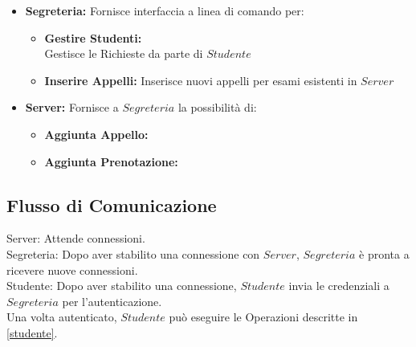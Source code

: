 \begin{itemize}
	\item \textbf{Segreteria:}\label{segreteria}  Fornisce interfaccia a linea di comando per:
	\begin{itemize}
		\item \textbf{Gestire Studenti:}\\
		Gestisce le Richieste da parte di $Studente$
		\item \textbf{Inserire Appelli:}
		Inserisce nuovi appelli per esami esistenti in $Server$
	\end{itemize}
\end{itemize}

\begin{itemize}
\item \textbf{Server:}\label{server} Fornisce a $Segreteria$ la possibilità di:
	\begin{itemize}
		\item \textbf{Aggiunta Appello:}\\
		\item \textbf{Aggiunta Prenotazione:}\\
	\end{itemize}
\end{itemize}

\subsection{Flusso di Comunicazione}
 Server: Attende connessioni.\\
 Segreteria: Dopo aver stabilito una connessione con $Server$, $Segreteria$ è pronta a ricevere nuove connessioni.\\
 Studente: Dopo aver stabilito una connessione, $Studente$ invia le credenziali a $Segreteria$ per l'autenticazione. \\
 Una volta autenticato, $Studente$ può eseguire le Operazioni descritte in \ref{studente}.\\
 
 
